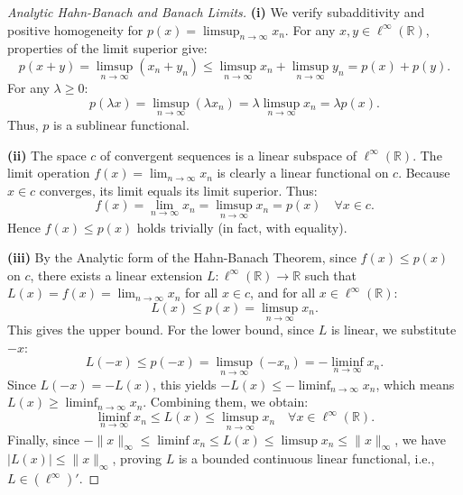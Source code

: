\documentclass{article}
\begin{document}
\begin{proof}[Analytic Hahn-Banach and Banach Limits]
    \textbf{(i)} We verify subadditivity and positive homogeneity for $p(x) = \limsup_{n \to \infty} x_n$.
    For any $x, y \in \ell^\infty(\mathbb{R})$, properties of the limit superior give:
    \[ p(x + y) = \limsup_{n \to \infty} (x_n + y_n) \le \limsup_{n \to \infty} x_n + \limsup_{n \to \infty} y_n = p(x) + p(y). \]
    For any $\lambda \ge 0$:
    \[ p(\lambda x) = \limsup_{n \to \infty} (\lambda x_n) = \lambda \limsup_{n \to \infty} x_n = \lambda p(x). \]
    Thus, $p$ is a sublinear functional.

    \textbf{(ii)} The space $c$ of convergent sequences is a linear subspace of $\ell^\infty(\mathbb{R})$. The limit operation $f(x) = \lim_{n \to \infty} x_n$ is clearly a linear functional on $c$. Because $x \in c$ converges, its limit equals its limit superior. Thus:
    \[ f(x) = \lim_{n \to \infty} x_n = \limsup_{n \to \infty} x_n = p(x) \quad \forall x \in c. \]
    Hence $f(x) \le p(x)$ holds trivially (in fact, with equality).

    \textbf{(iii)} By the Analytic form of the Hahn-Banach Theorem, since $f(x) \le p(x)$ on $c$, there exists a linear extension $L: \ell^\infty(\mathbb{R}) \to \mathbb{R}$ such that $L(x) = f(x) = \lim_{n \to \infty} x_n$ for all $x \in c$, and for all $x \in \ell^\infty(\mathbb{R})$:
    \[ L(x) \le p(x) = \limsup_{n \to \infty} x_n. \]
    This gives the upper bound. For the lower bound, since $L$ is linear, we substitute $-x$:
    \[ L(-x) \le p(-x) = \limsup_{n \to \infty} (-x_n) = -\liminf_{n \to \infty} x_n. \]
    Since $L(-x) = -L(x)$, this yields $-L(x) \le -\liminf_{n \to \infty} x_n$, which means $L(x) \ge \liminf_{n \to \infty} x_n$.
    Combining them, we obtain:
    \[ \liminf_{n \to \infty} x_n \le L(x) \le \limsup_{n \to \infty} x_n \quad \forall x \in \ell^\infty(\mathbb{R}). \]
    Finally, since $-\|x\|_\infty \le \liminf x_n \le L(x) \le \limsup x_n \le \|x\|_\infty$, we have $|L(x)| \le \|x\|_\infty$, proving $L$ is a bounded continuous linear functional, i.e., $L \in (\ell^\infty)'$.
\end{proof}
\end{document}
